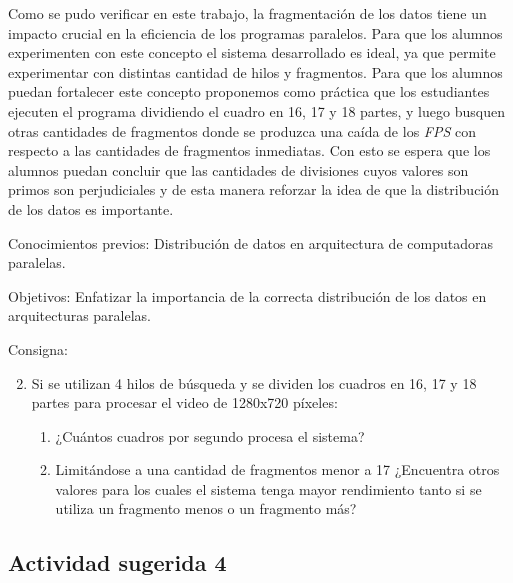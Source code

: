 Como se pudo verificar en este trabajo, la fragmentación de los datos tiene un
impacto crucial en la eficiencia de los programas paralelos. Para que los
alumnos experimenten con este concepto el sistema desarrollado es ideal, ya que
permite experimentar con distintas cantidad de hilos y fragmentos. Para que los
alumnos puedan fortalecer este concepto proponemos como práctica que los
estudiantes ejecuten el programa dividiendo el cuadro en 16, 17 y 18 partes, y
luego busquen otras cantidades de fragmentos donde se produzca una caída de los
\emph{FPS} con respecto a las cantidades de fragmentos inmediatas. Con esto se
espera que los alumnos puedan concluir que las cantidades de divisiones cuyos
valores son primos son perjudiciales y de esta manera reforzar la idea de que la
distribución de los datos es importante.

\begin{description}

	\item{Conocimientos previos}: Distribución de datos en arquitectura de
		computadoras paralelas.

	\item{Objetivos}: Enfatizar la importancia de la correcta distribución
		de los datos en arquitecturas paralelas.

	\item{Consigna}: \begin{enumerate}
	
	\setcounter{enumi}{1}

	\item{Si se utilizan 4 hilos de búsqueda y se dividen los cuadros en 16,
		17 y 18 partes para procesar el video de 1280x720 píxeles:

\begin{enumerate}

	\item{¿Cuántos cuadros por segundo procesa el sistema?}

	\item{Limitándose a una cantidad de fragmentos menor a 17 ¿Encuentra
		otros valores para los cuales el sistema tenga mayor rendimiento
		tanto si se utiliza un fragmento menos o un fragmento más?}

\end{enumerate}}

\end{enumerate}

\end{description}

\subsection{Actividad sugerida 4}

